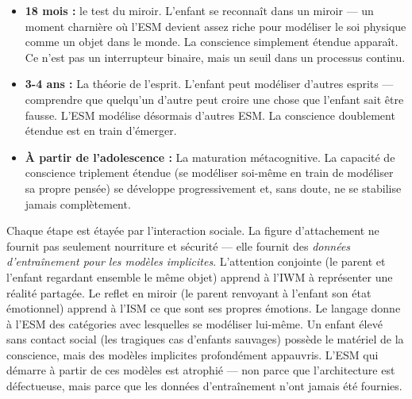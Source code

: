 \documentclass[11pt, twoside, openright]{book}
\begin{document}
\begin{itemize}
  \item \textbf{18 mois :} le test du miroir. L'enfant se reconnaît dans un miroir --- un moment charnière où l'ESM devient assez riche pour modéliser le soi physique comme un objet dans le monde. La conscience simplement étendue apparaît. Ce n'est pas un interrupteur binaire, mais un seuil dans un processus continu.
\end{itemize}

\begin{itemize}
  \item \textbf{3-4 ans :} La théorie de l'esprit. L'enfant peut modéliser d'autres esprits --- comprendre que quelqu'un d'autre peut croire une chose que l'enfant sait être fausse. L'ESM modélise désormais d'autres ESM. La conscience doublement étendue est en train d'émerger.
\end{itemize}

\begin{itemize}
  \item \textbf{À partir de l'adolescence :} La maturation métacognitive. La capacité de conscience triplement étendue (se modéliser soi-même en train de modéliser sa propre pensée) se développe progressivement et, sans doute, ne se stabilise jamais complètement.
\end{itemize}

Chaque étape est étayée par l'interaction sociale. La figure d'attachement ne fournit pas seulement nourriture et sécurité --- elle fournit des \textit{données d'entraînement pour les modèles implicites}. L'attention conjointe (le parent et l'enfant regardant ensemble le même objet) apprend à l'IWM à représenter une réalité partagée. Le reflet en miroir (le parent renvoyant à l'enfant son état émotionnel) apprend à l'ISM ce que sont ses propres émotions. Le langage donne à l'ESM des catégories avec lesquelles se modéliser lui-même. Un enfant élevé sans contact social (les tragiques cas d'enfants sauvages) possède le matériel de la conscience, mais des modèles implicites profondément appauvris. L'ESM qui démarre à partir de ces modèles est atrophié --- non parce que l'architecture est défectueuse, mais parce que les données d'entraînement n'ont jamais été fournies.
\end{document}

